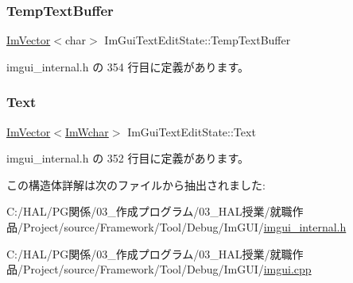 \subsubsection{\texorpdfstring{Temp\+Text\+Buffer}{TempTextBuffer}}
{\footnotesize\ttfamily \mbox{\hyperlink{class_im_vector}{Im\+Vector}}$<$char$>$ Im\+Gui\+Text\+Edit\+State\+::\+Temp\+Text\+Buffer}



 imgui\+\_\+internal.\+h の 354 行目に定義があります。

\mbox{\label{struct_im_gui_text_edit_state_a5c387aca48db34089a3c0ff251ff06fc}} 
\subsubsection{\texorpdfstring{Text}{Text}}
{\footnotesize\ttfamily \mbox{\hyperlink{class_im_vector}{Im\+Vector}}$<$\mbox{\hyperlink{imgui_8h_af2c7badaf05a0008e15ef76d40875e97}{Im\+Wchar}}$>$ Im\+Gui\+Text\+Edit\+State\+::\+Text}



 imgui\+\_\+internal.\+h の 352 行目に定義があります。



この構造体詳解は次のファイルから抽出されました\+:\begin{DoxyCompactItemize}
\item 
C\+:/\+H\+A\+L/\+P\+G関係/03\+\_\+作成プログラム/03\+\_\+\+H\+A\+L授業/就職作品/\+Project/source/\+Framework/\+Tool/\+Debug/\+Im\+G\+U\+I/\mbox{\hyperlink{imgui__internal_8h}{imgui\+\_\+internal.\+h}}\item 
C\+:/\+H\+A\+L/\+P\+G関係/03\+\_\+作成プログラム/03\+\_\+\+H\+A\+L授業/就職作品/\+Project/source/\+Framework/\+Tool/\+Debug/\+Im\+G\+U\+I/\mbox{\hyperlink{imgui_8cpp}{imgui.\+cpp}}\end{DoxyCompactItemize}
